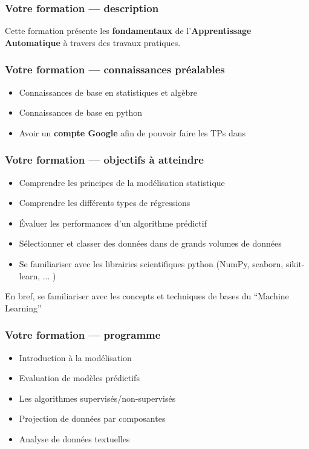 
\begin{frame}
  \frametitle{Votre formation — description}
  Cette formation présente les \textbf{fondamentaux} de l'\textbf{Apprentissage Automatique} à travers des travaux pratiques. \\
\end{frame}

\begin{frame}
  \frametitle{Votre formation — connaissances préalables}
  \begin{itemize}
  \item Connaissances de base en statistiques et algèbre
  \item Connaissances de base en python
  \item Avoir un \textbf{compte Google} afin de pouvoir faire les TPs dans 
  \end{itemize}
\end{frame}

\begin{frame}
  \frametitle{Votre formation — objectifs à atteindre}
  \begin{itemize}
  \item Comprendre les principes de la modélisation statistique
  \item Comprendre les différents types de régressions
  \item Évaluer les performances d'un algorithme prédictif
  \item Sélectionner et classer des données dans de grands volumes de données
  \item Se familiariser avec les librairies scientifiques python (NumPy, seaborn, sikit-learn, ... )
  \end{itemize}
  En bref, se familiariser avec les concepts et techniques de bases du ``Machine Learning''
\end{frame}

\begin{frame}
  \frametitle{Votre formation — programme}
  \begin{itemize}
  \item Introduction à la modélisation
  \item Evaluation de modèles prédictifs
  \item Les algorithmes supervisés/non-supervisés
  \item Projection de données par composantes
  \item Analyse de données textuelles
  \end{itemize}
\end{frame}
